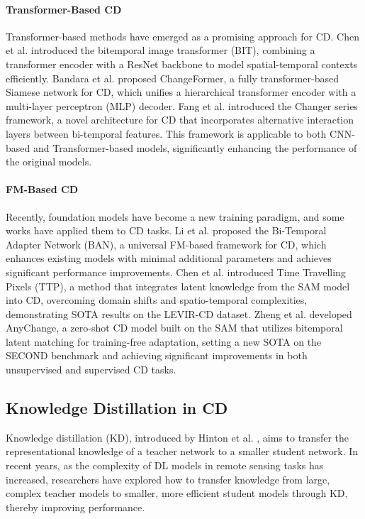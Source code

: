 \paragraph{Transformer-Based CD}  
Transformer-based methods have emerged as a promising approach for CD. 
Chen et al. \cite{bit} introduced the bitemporal image transformer (BIT), combining a transformer encoder with a ResNet backbone to model spatial-temporal contexts efficiently. 
Bandara et al. \cite{changeformer} proposed ChangeFormer, a fully transformer-based Siamese network for CD, which unifies a hierarchical transformer encoder with a multi-layer perceptron (MLP) decoder.
Fang et al. \cite{changer} introduced the Changer series framework, a novel architecture for CD that incorporates alternative interaction layers between bi-temporal features. 
This framework is applicable to both CNN-based and Transformer-based models, significantly enhancing the performance of the original models.

\paragraph{FM-Based CD}  
Recently, foundation models have become a new training paradigm, and some works have applied them to CD tasks.
Li et al. \cite{ban} proposed the Bi-Temporal Adapter Network (BAN), a universal FM-based framework for CD, which enhances existing models with minimal additional parameters and achieves significant performance improvements.
Chen et al. \cite{ttp} introduced Time Travelling Pixels (TTP), a method that integrates latent knowledge from the SAM model into CD, overcoming domain shifts and spatio-temporal complexities, demonstrating SOTA results on the LEVIR-CD\cite{stanet} dataset.
Zheng et al. \cite{anychange} developed AnyChange, a zero-shot CD model built on the SAM that utilizes bitemporal latent matching for training-free adaptation, setting a new SOTA on the SECOND\cite{second} benchmark and achieving significant improvements in both unsupervised and supervised CD tasks.

\subsection{Knowledge Distillation in CD}

Knowledge distillation (KD), introduced by Hinton et al. \cite{hinton}, aims to transfer the representational knowledge of a teacher network to a smaller student network. 
In recent years, as the complexity of DL models in remote sensing tasks has increased, researchers have explored how to transfer knowledge from large, complex teacher models to smaller, more efficient student models through KD, thereby improving performance\cite{dsrkd, sar}.

